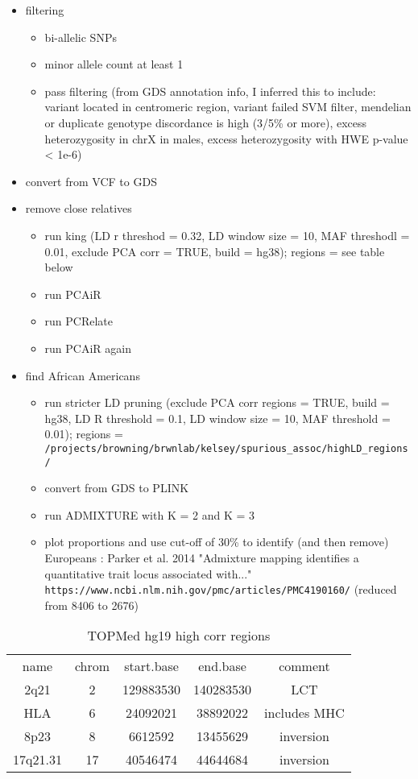 \documentclass[12pt]{article}
\begin{document}
\begin{itemize}
\item filtering
	\begin{itemize}
	\item bi-allelic SNPs
	\item minor allele count at least 1
	\item pass filtering (from GDS annotation info, I inferred this to include: variant located in centromeric region, variant failed SVM filter, mendelian or duplicate genotype discordance is high (3/5\% or more), excess heterozygosity in chrX in males, excess heterozygosity with HWE p-value < 1e-6)
	\end{itemize}
\item convert from VCF to GDS
\item remove close relatives
	\begin{itemize}
	\item run king (LD r threshod = 0.32, LD window size = 10, MAF threshodl = 0.01, exclude PCA corr = TRUE, build = hg38); regions =         see table below
	\item run PCAiR
	\item run PCRelate
	\item run PCAiR again
	\end{itemize}
\item find African Americans
	\begin{itemize}
	\item run stricter LD pruning (exclude PCA corr regions = TRUE, build = hg38, LD R threshold = 0.1, LD window size = 10, MAF threshold = 0.01); regions = \verb"/projects/browning/brwnlab/kelsey/spurious_assoc/highLD_regions/"
	\item convert from GDS to PLINK
	\item run ADMIXTURE with K = 2 and K = 3
	\item plot proportions and use cut-off of 30\% to identify (and then remove) Europeans : Parker et al. 2014 "Admixture mapping identifies a quantitative trait locus associated with..." \verb"https://www.ncbi.nlm.nih.gov/pmc/articles/PMC4190160/" (reduced from 8406 to 2676)
	\end{itemize}
\end{itemize}

\begin{table}
\begin{tabular}{ccccc}
name & chrom & start.base  & end.base  & comment \\
2q21    &  2  &  129883530 & 140283530       &  LCT \\
HLA      &    6 &   24092021  & 38892022 & includes MHC \\
8p23  &        8   &  6612592 &  13455629 &   inversion \\
17q21.31 &    17  &  40546474 & 44644684   &  inversion \\
\end{tabular}
\caption{TOPMed hg19 high corr regions}
\end{table}
\end{document}
